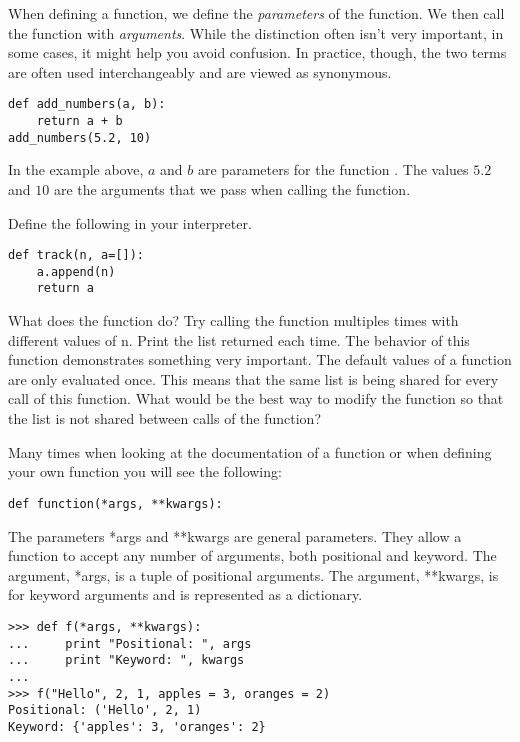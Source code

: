 \begin{example}
\begin{info}
When defining a function, we define the \emph{parameters} of the function.  We then call the function with \emph{arguments}.
While the distinction often isn't very important, in some cases, it might help you avoid confusion.
In practice, though, the two terms are often used interchangeably and are viewed as synonymous.
\begin{lstlisting}
def add_numbers(a, b):
    return a + b
add_numbers(5.2, 10)
\end{lstlisting}
In the example above, $a$ and $b$ are parameters for the function .
The values $5.2$ and $10$ are the arguments that we pass when calling the function.
\end{info}

\begin{problem}
Define the following in your interpreter.
\begin{lstlisting}
def track(n, a=[]):
    a.append(n)
    return a
\end{lstlisting}
What does the function do?
Try calling the function multiples times with different values of n.
Print the list returned each time.
The behavior of this function demonstrates something very important.
The default values of a function are only evaluated once.
This means that the same list is being shared for every call of this function.
What would be the best way to modify the function so that the list is not shared between calls of the function?
\end{problem}

Many times when looking at the documentation of a function or when defining your own function you will see the following:
\begin{lstlisting}
def function(*args, **kwargs):
\end{lstlisting}

The parameters *args and **kwargs are general parameters.
They allow a function to accept any number of arguments, both positional and keyword.
The argument, *args, is a tuple of positional arguments.
The argument, **kwargs, is for keyword arguments and is represented as a dictionary.
\begin{lstlisting}
>>> def f(*args, **kwargs):
...     print "Positional: ", args
...     print "Keyword: ", kwargs
...     
>>> f("Hello", 2, 1, apples = 3, oranges = 2)
Positional: ('Hello', 2, 1)
Keyword: {'apples': 3, 'oranges': 2}
\end{lstlisting}
\end{example}

